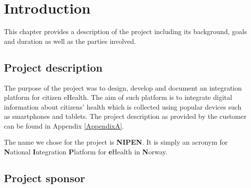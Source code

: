 
\chapter{Introduction} 
\label{Introduction} 


This chapter provides a description of the project including its background, goals and duration as well as the parties involved.

\section{Project description}
\label{section:description}

The purpose of the project was to design, develop and document an integration platform for citizen eHealth\cite{ehealth}. 
The aim of such platform is to integrate digital information about citizens' health which is collected using popular
devices such as smartphones and tablets.
The project description as provided by the customer can be found in Appendix \ref{AppendixA}.



The name we chose for the project is \textbf{NIPEN}.\newline
It is simply an acronym for \textbf{N}ational \textbf{I}ntegration \textbf{P}latform for \textbf{e}Health
in \textbf{N}orway.

\section{Project sponsor}
\label{section:client}

